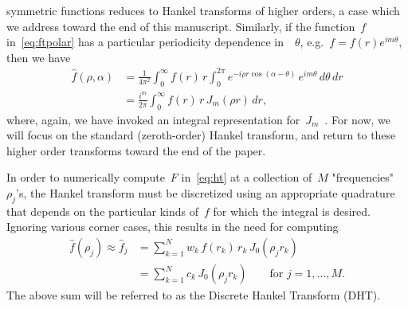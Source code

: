 symmetric functions reduces to Hankel transforms of higher orders, a case which
we address toward the end of this manuscript. Similarly, if the function~$f$
in~\eqref{eq:ftpolar} has a particular periodicity dependence in~~$\theta$,
e.g.~$f = f(r)e^{im\theta}$, then we have
\begin{equation}
  \begin{aligned}
  \hat{f}(\rho,\alpha) &= \frac{1}{4\pi^2} \int_0^\infty f(r) \, r \int_0^{2\pi} 
  e^{-i \rho r \cos(\alpha - \theta) } \, e^{im\theta}  \, d\theta \, dr \\
  &= \frac{i^m}{2\pi} \int_0^\infty f(r) \, r \, J_m(\rho r)  \, dr,
  \end{aligned}
\end{equation}
where, again, we have invoked an integral representation
for~$J_m$~\cite{olver2010nist}. For now, we will focus on the standard
(zeroth-order) Hankel transform, and return to these higher order transforms
toward the end of the paper.

In order to numerically compute~$F$ in~\eqref{eq:ht} at a collection of~$M$
"frequencies"~$\rho_j$'s, the Hankel transform must be discretized using an
appropriate quadrature that depends on the particular kinds of~$f$ for which the
integral is desired. Ignoring various corner cases, this results in the need for
computing
\begin{equation}
  \begin{aligned}
  \hat{f}(\rho_j) \approx \hat{f}_j &= \sum_{k=1}^N w_k \, f(r_k) \, r_k \, J_0(\rho_j r_k) \\
  &= \sum_{k=1}^N c_k \, J_0(\rho_j r_k)
   \qquad \text{for } j = 1, \ldots, M.
  \end{aligned}
\end{equation}
The above sum will be referred to as the Discrete Hankel Transform (DHT). 

